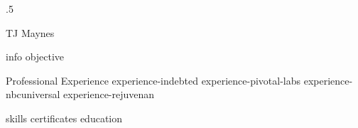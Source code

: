 \documentclass[10pt]{article}
\begin{document}
\moveleft.5\hoffset\centerline{\huge TJ Maynes}
{info}
{objective}
\begin{section}{Professional Experience}
  {experience-indebted}
  {experience-pivotal-labs}
  {experience-nbcuniversal}
  {experience-rejuvenan}
\end{section}
{skills}
{certificates}
{education}
\end{document}
